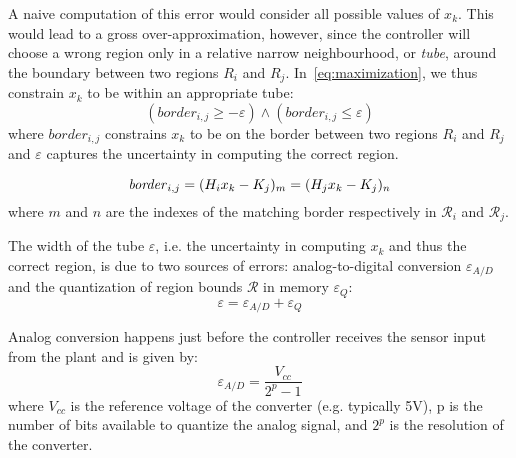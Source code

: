 
A naive computation of this error would consider all possible values of $x_k$.
This would lead to a gross over-approximation, however, since the controller
will choose a wrong region only in a relative narrow neighbourhood, or
\emph{tube}, around the boundary between two regions $R_i$ and $R_j$.
In~\autoref{eq:maximization}, we thus constrain $x_k$ to be within an appropriate tube:
\begin{equation}\label{eq:tube}
(\mathit{border}_{i,j} \ge -\varepsilon) \land (\mathit{border}_{i,j} \le \varepsilon)
\end{equation}
where $\mathit{border}_{i,j}$ constrains $x_k$ to be on the border between two regions
$R_i$ and $R_j$ and $\varepsilon$ captures the uncertainty in computing the
correct region.

\begin{equation}
\mathit{border}_{i,j}=(H_{i}x_{k}-K_{j})_{m} = (H_{j}x_{k}-K_{j})_{n}
\end{equation}
where $m$ and $n$ are the indexes of the matching border respectively in $\mathcal{R}_{i}$ and $\mathcal{R}_{j}$.

The width of the tube $\varepsilon$, i.e. the uncertainty in computing $x_k$ and
thus the correct region, is due to two sources of errors: analog-to-digital
conversion $\varepsilon_{A/D}$ and the quantization of region bounds
$\mathcal{R}$ in memory $\varepsilon_{Q}$:
\begin{equation}\label{eq:epsilontot}
  \varepsilon=\varepsilon_{A/D}+\varepsilon_{Q}
\end{equation}

Analog conversion happens just before the controller receives the sensor input from the plant
and is given by:
\begin{equation*}
\varepsilon_{A/D}=\frac{V_{cc}}{2^{p}-1}
\end{equation*}
where $V_{cc}$ is the reference voltage of the converter (e.g. typically 5V), p is the number of bits available to quantize the analog signal, and $2^{p}$ is the resolution of the converter.


